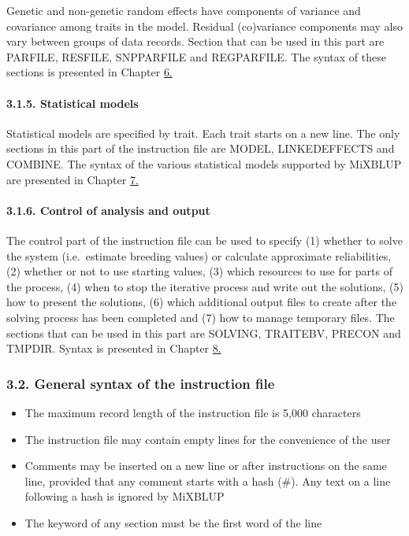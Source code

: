 Genetic and non-genetic random effects have components of variance and
covariance among traits in the model. Residual (co)variance components
may also vary between groups of data records. Section that can be used
in this part are PARFILE, RESFILE, SNPPARFILE and REGPARFILE. The syntax
of these sections is presented in Chapter \hyperref[Comp01]{6.}

\paragraph{3.1.5. Statistical models}\label{Inst07}

Statistical models are specified by trait. Each trait starts on a new
line. The only sections in this part of the instruction file are MODEL,
LINKEDEFFECTS and COMBINE. The syntax of the various statistical models
supported by MiXBLUP are presented in Chapter \hyperref[Stat01]{7.}

\paragraph{3.1.6. Control of analysis and output}\label{Inst08}

The control part of the instruction file can be used to specify (1)
whether to solve the system (i.e.~estimate breeding values) or calculate
approximate reliabilities, (2) whether or not to use starting values,
(3) which resources to use for parts of the process, (4) when to stop
the iterative process and write out the solutions, (5) how to present
the solutions, (6) which additional output files to create after the
solving process has been completed and (7) how to manage temporary
files. The sections that can be used in this part are SOLVING, TRAITEBV,
PRECON and TMPDIR. Syntax is presented in Chapter \hyperref[Cont01]{8.}

\subsubsection{3.2. General syntax of the instruction
file}\label{Inst09}

\begin{itemize}
\tightlist
\item
  The maximum record length of the instruction file is 5,000 characters
\item
  The instruction file may contain empty lines for the convenience of
  the user
\item
  Comments may be inserted on a new line or after instructions on the
  same line, provided that any comment starts with a hash (\#). Any text
  on a line following a hash is ignored by MiXBLUP
\item
  The keyword of any section must be the first word of the line
\end{itemize}

